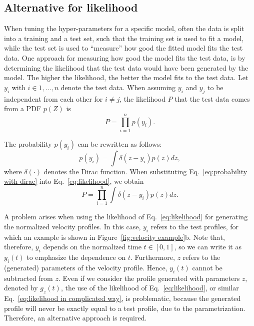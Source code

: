 \documentclass[10pt,final,a4paper,oneside,onecolumn]{article}
\theoremstyle{plain}\newtheorem{definition}{Definition}[section]    %
\theoremstyle{definition}\newtheorem{example}{Example}[section]     %
\theoremstyle{remark}\newtheorem{remarkenv}{Remark}[section]        %
\begin{document}
\subsection{Alternative for likelihood}
\label{sec:method alternative likelihood}

When tuning the hyper-parameters for a specific model, often the data is split into a training and a test set, such that the training set is used to fit a model, while the test set is used to ``measure'' how good the fitted model fits the test data. One approach for measuring how good the model fits the test data, is by determining the likelihood that the test data would have been generated by the model. The higher the likelihood, the better the model fits to the test data. Let $y_i$ with $i \in {1, \ldots, n}$ denote the test data. When assuming $y_i$ and $y_j$ to be independent from each other for $i \neq j$, the likelihood $P$ that the test data comes from a PDF $p(Z)$ is
\begin{equation} \label{eq:likelihood}
	P = \prod_{i=1}^n p(y_i).
\end{equation}

The probability $p(y_i)$ can be rewritten as follows:
\begin{equation} \label{eq:probability with dirac}
	p(y_i) = \int \delta(z-y_i) p(z) dz,
\end{equation}
where $\delta(\cdot)$ denotes the Dirac function. When substituting Eq.~\eqref{eq:probability with dirac} into Eq.~\eqref{eq:likelihood}, we obtain
\begin{equation} \label{eq:likelihood in complicated way}
	P = \prod_{i=1}^n \int \delta(z - y_i) p(z) dz.
\end{equation}

A problem arises when using the likelihood of Eq.~\eqref{eq:likelihood} for generating the normalized velocity profiles. In this case, $y_i$ refers to the test profiles, for which an example is shown in Figure~\ref{fig:velocity example}b. Note that, therefore, $y_i$ depends on the normalized time $t \in [0,1]$, so we can write it as $y_i(t)$ to emphasize the dependence on $t$. Furthermore, $z$ refers to the (generated) parameters of the velocity profile. Hence, $y_i(t)$ cannot be subtracted from $z$. Even if we consider the profile generated with parameters $z$, denoted by $g_z(t)$, the use of the likelihood of Eq.~\eqref{eq:likelihood}, or similar Eq.~\eqref{eq:likelihood in complicated way}, is problematic, because the generated profile will never be exactly equal to a test profile, due to the parametrization. Therefore, an alternative approach is required.
\end{document}
